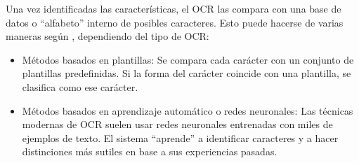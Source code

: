 \begin{enumerate}
	Una vez identificadas las características, el OCR las compara con una base de datos o ``alfabeto'' interno de posibles caracteres. Esto puede hacerse de varias maneras según \cite{WhatIsOCR}, dependiendo del tipo de OCR:
	\begin{itemize}
		\item Métodos basados en plantillas: Se compara cada carácter con un conjunto de plantillas predefinidas. Si la forma del carácter coincide con una plantilla, se clasifica como ese carácter.
		\item Métodos basados en aprendizaje automático o redes neuronales: Las técnicas modernas de OCR suelen usar redes neuronales entrenadas con miles de ejemplos de texto. El sistema ``aprende'' a identificar caracteres y a hacer distinciones más sutiles en base a sus experiencias pasadas.
	\end{itemize}

	
	
\end{enumerate}

